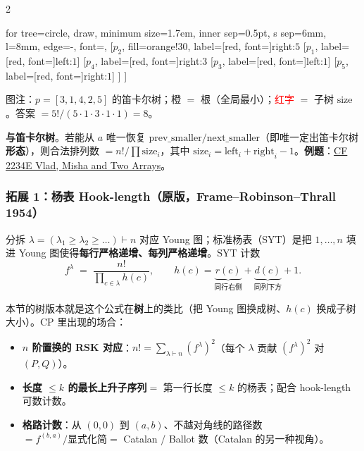 \begin{multicols*}{2}
		\begin{center}
		\begin{forest}
			for tree={circle, draw, minimum size=1.7em, inner sep=0.5pt, s sep=6mm, l=8mm, edge={-}, font=\scriptsize},
			[$p_2$, fill=orange!30, label={[red, font=\tiny]right:$5$}
				[$p_1$, label={[red, font=\tiny]left:$1$}]
				[$p_4$, label={[red, font=\tiny]right:$3$}
					[$p_3$, label={[red, font=\tiny]left:$1$}]
					[$p_5$, label={[red, font=\tiny]right:$1$}]
				]
			]
		\end{forest}

		\vspace{2pt}
		{\footnotesize\sffamily\color{gray} 图注：$p = [3, 1, 4, 2, 5]$ 的笛卡尔树；\textcolor{orange!75!black}{橙} $=$ 根（全局最小）；\textcolor{red}{红字} $=$ 子树 $\mathrm{size}$。答案 $= 5!/(5 \cdot 1 \cdot 3 \cdot 1 \cdot 1) = 8$。}
		\end{center}

		\textbf{与笛卡尔树}。若能从 $a$ 唯一恢复 $\mathrm{prev}\_\mathrm{smaller} / \mathrm{next}\_\mathrm{smaller}$（即唯一定出笛卡尔树\textbf{形态}），则合法排列数 $= n! / \prod \mathrm{size}_i$，其中 $\mathrm{size}_i = \mathrm{left}_i + \mathrm{right}_i - 1$。\textbf{例题}：\href{https://codeforces.com/contest/2234/problem/E}{CF 2234E Vlad, Misha and Two Arrays}。

		\subsubsection*{拓展 1：杨表 Hook-length（原版，Frame--Robinson--Thrall 1954）}

		分拆 $\lambda = (\lambda_1 \ge \lambda_2 \ge \dots) \vdash n$ 对应 Young 图；标准杨表（SYT）是把 $1, \dots, n$ 填进 Young 图使得\textbf{每行严格递增、每列严格递增}。SYT 计数
		\[
			f^\lambda \;=\; \frac{n!}{\displaystyle\prod_{c \in \lambda} h(c)}, \qquad h(c) = \underbrace{r(c)}_{\text{同行右侧}} + \underbrace{d(c)}_{\text{同列下方}} + 1.
		\]

		本节的树版本就是这个公式在\textbf{树}上的类比（把 Young 图换成树、$h(c)$ 换成子树大小）。CP 里出现的场合：
		\begin{itemize}
			\item \textbf{$n$ 阶置换的 RSK 对应}：$n! = \sum_{\lambda \vdash n} (f^\lambda)^2$（每个 $\lambda$ 贡献 $(f^\lambda)^2$ 对 $(P, Q)$）。
			\item \textbf{长度 $\le k$ 的最长上升子序列}$= $ 第一行长度 $\le k$ 的杨表；配合 hook-length 可数计数。
			\item \textbf{格路计数}：从 $(0,0)$ 到 $(a, b)$、不越对角线的路径数 $= f^{(b, a)} / \text{显式化简} = $ Catalan / Ballot 数（Catalan 的另一种视角）。
		\end{itemize}


\end{multicols*}
